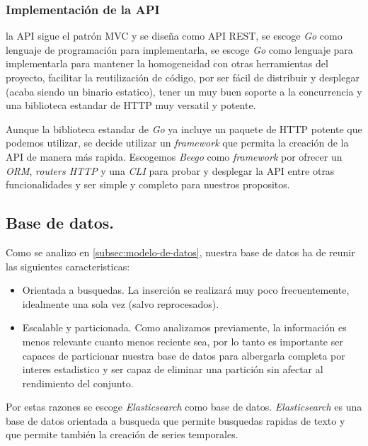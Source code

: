 \subsubsection{Implementación de la API}
\label{subsubsec:sinkers-registry-api-implementacion}

la API sigue el patrón MVC y se diseña como API REST, se escoge \emph{Go} como lenguaje de programación para implementarla, se escoge \emph{Go} 
como lenguaje para implementarla para mantener la homogeneidad con otras herramientas del proyecto, facilitar la reutilización de código,
por ser fácil de distribuir y desplegar (acaba siendo un binario estatico), tener un muy buen soporte a la concurrencia y una biblioteca
estandar de HTTP muy versatil y potente.

Aunque la biblioteca estandar de \emph{Go} ya incluye un paquete de HTTP potente que podemos utilizar, se decide utilizar un \emph{framework} 
que permita la creación de la API de manera más rapida. Escogemos \emph{Beego} como \emph{framework} por ofrecer un \emph{ORM},
\emph{routers HTTP} y una \emph{CLI} para probar y desplegar la API entre otras funcionalidades y ser simple y completo para nuestros
propositos.

\subsection{Base de datos.}

Como se analizo en \ref{subsec:modelo-de-datos}, nuestra base de datos ha de reunir las siguientes caracteristicas:

\begin{itemize}
    \item Orientada a busquedas. La inserción se realizará muy poco frecuentemente, idealmente una sola vez (salvo reprocesados).
    \item Escalable y particionada. Como analizamos previamente, la información es menos relevante cuanto menos reciente sea, por lo tanto es importante
    ser capaces de particionar nuestra base de datos para albergarla completa por interes estadistico y ser capaz de eliminar una partición sin afectar al rendimiento del conjunto.
\end{itemize}

Por estas razones se escoge \emph{Elasticsearch} como base de datos. \emph{Elasticsearch} es una base de datos orientada a busqueda que permite
busquedas rapidas de texto y que permite también la creación de series temporales.

